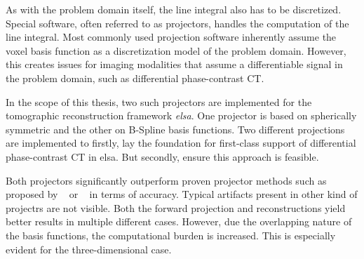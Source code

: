 As with the problem domain itself, the line integral also has to be discretized. Special software,
often referred to as projectors, handles the computation of the line integral. Most commonly used
projection software inherently assume the voxel basis function as a discretization model of the
problem domain. However, this creates issues for imaging modalities that assume a differentiable
signal in the problem domain, such as differential phase-contrast CT.

In the scope of this thesis, two such projectors are implemented for the tomographic reconstruction
framework \textit{elsa}. One projector is based on spherically symmetric and the other on B-Spline
basis functions. Two different projections are implemented to firstly, lay the foundation for
first-class support of differential phase-contrast CT in elsa. But secondly, ensure this approach is
feasible.

Both projectors significantly outperform proven projector methods such as proposed by
\citeauthor*{siddon_fast_1985}~\cite{siddon_fast_1985} or
\citeauthor*{joseph_improved_1982}~\cite{joseph_improved_1982} in terms of accuracy. Typical
artifacts present in other kind of projectrs are not visible. Both the forward projection and
reconstructions yield better results in multiple different cases. However, due the overlapping
nature of the basis functions, the computational burden is increased. This is especially evident for
the three-dimensional case.
